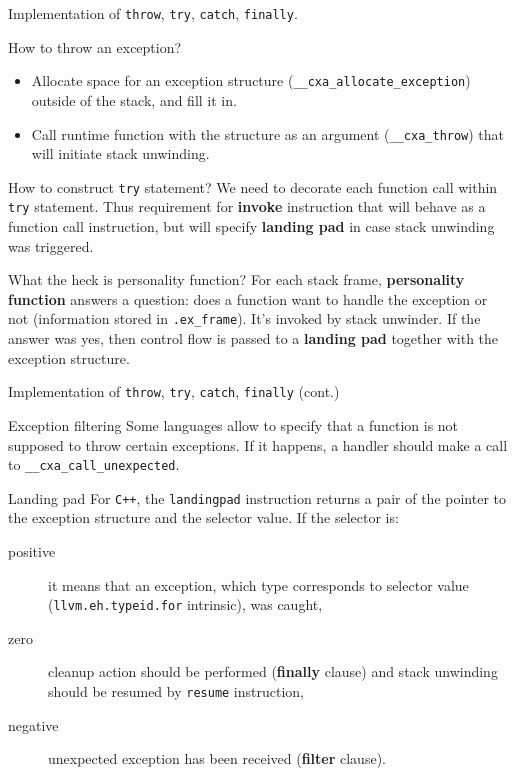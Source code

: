 \documentclass[8pt]{beamer}
\begin{document}
\begin{frame}[fragile]{Implementation of \texttt{throw}, \texttt{try},
    \texttt{catch}, \texttt{finally}.}
  \begin{block}{How to throw an exception?}
    \begin{itemize}
      \item Allocate space for an exception structure
        (\verb+__cxa_allocate_exception+) outside of the stack, and fill it in.
      \item Call runtime function with the structure as an argument
        (\verb+__cxa_throw+) that will initiate stack unwinding.
    \end{itemize}
  \end{block}

  \begin{block}{How to construct \texttt{try} statement?}
    We need to decorate each function call within \texttt{try} statement. Thus
    requirement for \textbf{invoke} instruction that will behave as a function
    call instruction, but will specify \textbf{landing pad} in case stack
    unwinding was triggered.
  \end{block}

  \begin{block}{What the heck is personality function?}
    For each stack frame, \textbf{personality function} answers a question: does
    a function want to handle the exception or not (information stored in
    \verb+.ex_frame+). It's invoked by stack unwinder. If the answer was yes,
    then control flow is passed to a \textbf{landing pad} together with the
    exception structure.
  \end{block}
\end{frame}

\begin{frame}[fragile]{Implementation of \texttt{throw}, \texttt{try},
    \texttt{catch}, \texttt{finally} (cont.)}
  \begin{block}{Exception filtering}
    Some languages allow to specify that a function is not supposed to throw
    certain exceptions. If it happens, a handler should make a call
    to \verb+__cxa_call_unexpected+.
  \end{block}

  \begin{block}{Landing pad}
    For \verb|C++|, the \verb+landingpad+ instruction returns a pair of the pointer to
    the exception structure and the selector value. If the selector is:
    \begin{description}
      \item[positive] it means that an exception, which type corresponds to
        selector value (\verb+llvm.eh.typeid.for+ intrinsic), was caught,
      \item[zero] cleanup action should be performed (\textbf{finally} clause)
        and stack unwinding should be resumed by \verb+resume+ instruction,
      \item[negative] unexpected exception has been received (\textbf{filter} clause).
    \end{description}
  \end{block}
\end{frame}
\end{document}
